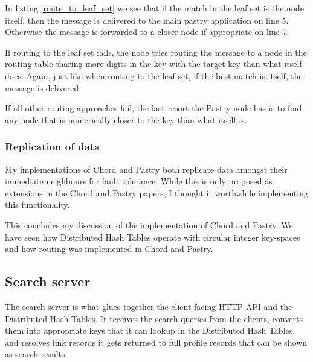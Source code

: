 In listing \ref{route_to_leaf_set} we see that if the match in the leaf set is the node itself, then the message is delivered to the main pastry application on line 5. Otherwise the message is forwarded to a closer node if appropriate on line 7.



If routing to the leaf set fails, the node tries routing the message to a node in the routing table sharing more digits in the key with the target key than what itself does. Again, just like when routing to the leaf set, if the best match is itself, the message is delivered.



If all other routing approaches fail, the last resort the Pastry node has is to find any node that is numerically closer to the key than what itself is.



\subsubsection{Replication of data}
My implementations of Chord and Pastry both replicate data amongst their immediate neighbours for fault tolerance. While this is only proposed as extensions in the Chord and Pastry papers, I thought it worthwhile implementing this functionality.

\mbox{}

This concludes my discussion of the implementation of Chord and Pastry. We have seen how Distributed Hash Tables operate with circular integer key-spaces and how routing was implemented in Chord and Pastry.

\subsection{Search server}
The search server is what glues together the client facing HTTP API and the Distributed Hash Tables. It receives the search queries from the clients, converts them into appropriate keys that it can lookup in the Distributed Hash Tables, and resolves link records it gets returned to full profile records that can be shown as search results.


